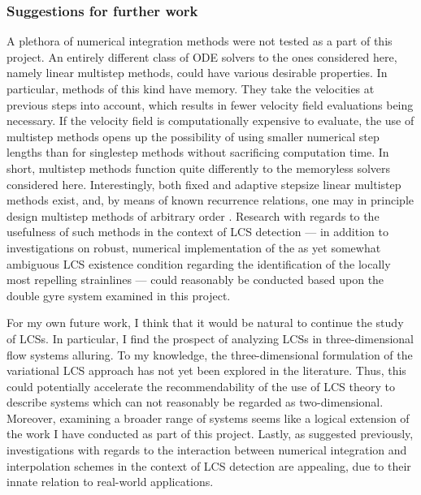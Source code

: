 \subsubsection{Suggestions for further work}

A plethora of numerical integration methods were not tested as a part of this
project. An entirely different class of ODE solvers to the ones considered here,
namely linear multistep methods, could have various desirable properties. In
particular, methods of this kind have memory. They take the velocities at
previous steps into account, which results in fewer velocity field evaluations
being necessary. If the velocity field is computationally expensive to evaluate,
the use of multistep methods opens up the possibility of using smaller numerical
step lengths than for singlestep methods without sacrificing computation time.
In short, multistep methods function quite differently to the memoryless
solvers considered here. Interestingly, both fixed and adaptive stepsize linear
multistep methods exist, and, by means of known recurrence relations, one may in
principle design multistep methods of arbitrary order
\parencite[chapter III]{hairer1993solving}. Research with regards to the
usefulness of such methods in the context of LCS detection --- in addition to
investigations on robust, numerical implementation of the as yet somewhat
ambiguous LCS existence condition regarding the identification of the locally
most repelling strainlines --- could reasonably be conducted based upon
the double gyre system examined in this project.

For my own future work, I think that it would be natural to continue
the study of LCSs. In particular, I find the prospect of analyzing LCSs in
three-dimensional flow systems alluring. To my knowledge, the three-dimensional
formulation of the variational LCS approach has not yet been explored in the
literature. Thus, this could potentially accelerate the recommendability of
the use of LCS theory to describe systems which can not reasonably be regarded
as two-dimensional. Moreover, examining a broader range of systems seems like
a logical extension of the work I have conducted as part of this project.
Lastly, as suggested previously, investigations with regards to the interaction
between numerical integration and interpolation schemes in the context of LCS
detection are appealing, due to their innate relation to real-world
applications.

